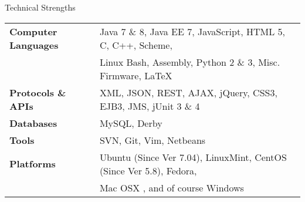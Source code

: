 \documentclass{resume} %
\begin{document}

\begin{rSection}{Technical Strengths}

\begin{tabular}{ @{} >{\bfseries}l @{\hspace{6ex}} l }
Computer Languages & Java 7 \& 8, Java EE 7, JavaScript,  HTML 5, C, C++,  Scheme,\\
 &  Linux Bash, Assembly, Python 2 \& 3, Misc. Firmware, \LaTeX \\
Protocols \& APIs & XML, JSON,  REST, AJAX, jQuery, CSS3, EJB3, JMS, jUnit 3 \& 4 \\
Databases & MySQL, Derby \\
Tools & SVN, Git, Vim, Netbeans \\
Platforms & Ubuntu (Since Ver 7.04), LinuxMint, CentOS (Since Ver 5.8), Fedora, \\
 & Mac OSX , and of course Windows \\
\end{tabular}

\end{rSection}





\end{document}
